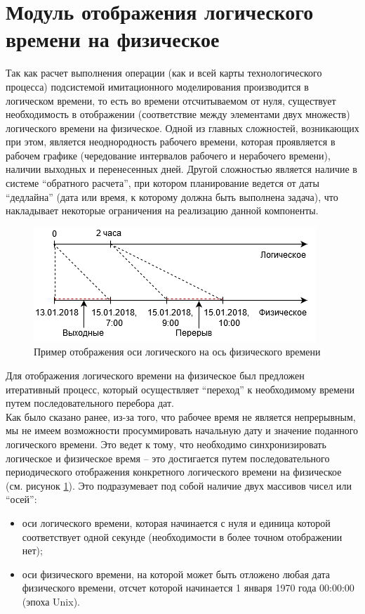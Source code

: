 \section{Модуль отображения логического времени на физическое}
\indent Так как расчет выполнения операции (как и всей карты технологического процесса) подсистемой имитационного моделирования производится в логическом времени, то есть во времени отсчитываемом от нуля, существует необходимость в отображении (соответствие между элементами двух множеств) логического времени на физическое.
Одной из главных сложностей, возникающих при этом, является неоднородность рабочего времени, которая проявляется в рабочем графике (чередование интервалов рабочего и нерабочего времени), наличии выходных и перенесенных дней.
Другой сложностью является наличие в системе ``обратного расчета'', при котором планирование ведется от даты ``дедлайна'' (дата или время, к которому должна быть выполнена задача), что накладывает некоторые ограничения на реализацию данной компоненты.
\begin{figure}[h!]
	\centering
	\includegraphics[width=0.7\linewidth]{pics/scheduleAxes.png}
	\caption{Пример отображения оси логического на ось физического времени}
	\label{fig:axes}
\end{figure}

\indent Для отображения логического времени на физическое был предложен итеративный процесс, который осуществляет ``переход'' к необходимому времени путем последовательного перебора дат.\\
\indent Как было сказано ранее, из-за того, что рабочее время не является непрерывным, мы не имеем возможности просуммировать начальную дату и значение поданного логического времени.
Это ведет к тому, что необходимо синхронизировать логическое и физическое время -- это достигается путем последовательного периодического отображения конкретного логического времени на физическое (см. рисунок \ref{fig:axes}).
Это подразумевает под собой наличие двух массивов чисел или ``осей'':

\begin{itemize}
	\item оси логического времени, которая начинается с нуля и единица которой соответствует одной секунде (необходимости в более точном отображении нет);
	\item оси физического времени, на которой может быть отложено любая дата физического времени, отсчет которой начинается 1 января 1970 года 00:00:00 (эпоха Unix).
\end{itemize}

